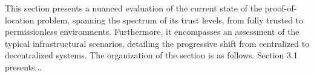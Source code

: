 This section presents a nuanced evaluation of the current state of the proof-of-location problem, spanning the spectrum of its trust levels, from fully trusted to permissionless environments. Furthermore, it encompasses an assessment of the typical infrastructural scenarios, detailing the progressive shift from centralized to decentralized systems. The organization of the section is as follows. Section 3.1 presents...